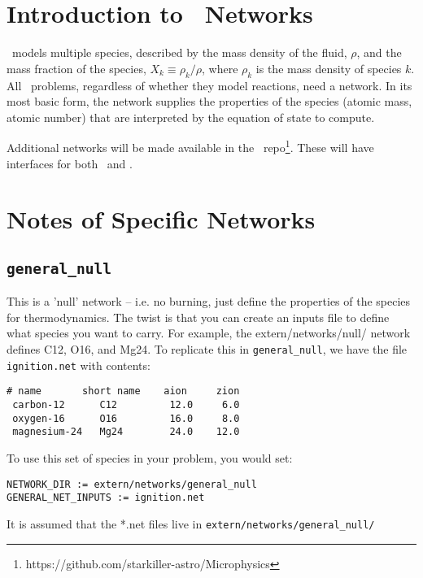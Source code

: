 \section{Introduction to \maestro\ Networks}

\maestro\ models multiple species, described by the mass density of
the fluid, $\rho$, and the mass fraction of the species, $X_k \equiv
\rho_k/\rho$, where $\rho_k$ is the mass density of species $k$.  All
\maestro\ problems, regardless of whether they model reactions, need a
network.  In its most basic form, the network supplies the properties
of the species (atomic mass, atomic number) that are interpreted by
the equation of state to compute.

Additional networks will be made available in the \microphysics\
repo\footnote{https://github.com/starkiller-astro/Microphysics}.  These
will have interfaces for both \maestro\ and \castro.

\section{Notes of Specific Networks}

\subsection{{\tt general\_null}}

This is a 'null' network -- i.e. no burning, just define the
properties of the species for thermodynamics.  The twist is that you
can create an inputs file to define what species you want to carry.
For example, the extern/networks/null/ network defines C12, O16, and
Mg24.  To replicate this in {\tt general\_null}, we have the file
{\tt ignition.net} with contents:

\begin{verbatim}
# name       short name    aion     zion
 carbon-12      C12         12.0     6.0
 oxygen-16      O16         16.0     8.0
 magnesium-24   Mg24        24.0    12.0
\end{verbatim}

To use this set of species in your problem, you would set:

\begin{verbatim}
NETWORK_DIR := extern/networks/general_null
GENERAL_NET_INPUTS := ignition.net
\end{verbatim}

It is assumed that the *.net files live in {\tt extern/networks/general\_null/}

